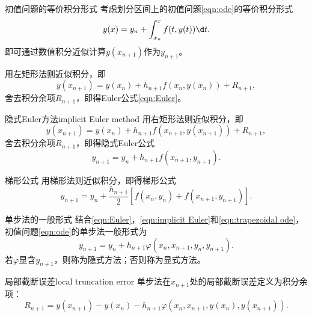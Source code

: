 \begin{theorem}
    {初值问题的等价积分形式}{}
    考虑划分区间上的初值问题\eqref{eqn:ode}的等价积分形式
    \[
        y(x)=y_n+\int_{x_n}^xf(t,y(t))\d t.
    \]
    即可通过数值积分近似计算$y(x_{n+1})$作为$y_{n+1}$。
\end{theorem}

\begin{corollary}
    用左矩形法则近似积分，即
    \[
        y(x_{n+1})=y(x_n)+h_{n+1}f(x_n,y(x_n))+R_{n+1},
    \]
    舍去积分余项$R_{n+1}$，即得Euler公式\eqref{eqn:Euler}。
\end{corollary}

\begin{example}
    {隐式Euler方法}{implicit Euler method}
    用右矩形法则近似积分，即
    \[
        y(x_{n+1})=y(x_n)+h_{n+1}f(x_{n+1},y(x_{n+1}))+R_{n+1},
    \]
    舍去积分余项$R_{n+1}$，即得隐式Euler公式
    \begin{equation}
        \label{eqn:implicit Euler}
        y_{n+1}=y_n+h_{n+1}f(x_{n+1},y_{n+1}).
    \end{equation}
\end{example}

\begin{example}
    {梯形公式}{}
    用梯形法则近似积分，即得梯形公式
    \begin{equation}
        \label{eqn:trapezoidal ode}
        y_{n+1}=y_n+\frac{h_{n+1}}2[f(x_n,y_n)+f(x_{n+1},y_{n+1})].
    \end{equation}
\end{example}

\begin{definition}
    {单步法的一般形式}{}
    结合\eqref{eqn:Euler}，\eqref{eqn:implicit Euler}和\eqref{eqn:trapezoidal ode}，初值问题\eqref{eqn:ode}的单步法一般形式为
    \[
        y_{n+1}=y_n+h_{n+1}\varphi(x_n,x_{n+1},y_n,y_{n+1}).
    \]
    若$\varphi$显含$y_{n+1}$，则称为隐式方法；否则称为显式方法。
\end{definition}

\begin{definition}
    {局部截断误差}{local truncation error}
    单步法在$x_{n+1}$处的局部截断误差定义为积分余项：
    \[
        R_{n+1}=y(x_{n+1})-y(x_n)-h_{n+1}\varphi(x_n,x_{n+1},y(x_n),y(x_{n+1})).
    \]
\end{definition}

